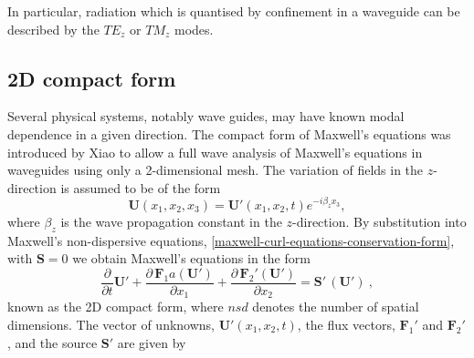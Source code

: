 In particular, radiation which is quantised by confinement in a waveguide can be described by the $TE_z$ or $TM_z$ modes.

\subsection{2D compact form}

Several physical systems, notably wave guides, may have known modal dependence in a given direction. The compact form of Maxwell's equations was introduced by Xiao \cite{Xiao:1992be} to allow a full wave analysis of Maxwell's equations in waveguides using only a 2-dimensional mesh. The variation of fields in the $z$-direction is assumed to be of the form
\begin{equation}
    \mathbf{U}(x_1,x_2,x_3) = \mathbf{U}'(x_1, x_2,t) e^{-i \beta_z x_3},
\label{compact2D-zdep}
\end{equation}
where $\beta_z$ is the wave propagation constant in the $z$-direction. By substitution into Maxwell's non-dispersive equations, \ref{maxwell-curl-equations-conservation-form}, with $\mathbf{S} = 0$ we obtain Maxwell's equations in the form
\begin{equation}
\frac{\partial}{\partial t} \mathbf{U}'+ 
\frac { \partial \, \mathbf{F}_1a(\mathbf{U}') }{ \partial x_1 } +
\frac { \partial \, \mathbf{F}_2'(\mathbf{U}') }{ \partial x_2 } =
\mathbf{S}'\,(\mathbf{U}') \: ,
\end{equation}
known as the 2D compact form, where $nsd$ denotes the number of spatial dimensions. The vector of unknowns, $\mathbf{U}'(x_1,x_2,t)$, the flux vectors, $\mathbf{F}_1'$ and $\mathbf{F}_2'$, and the source $\mathbf{S}'$ are given by
